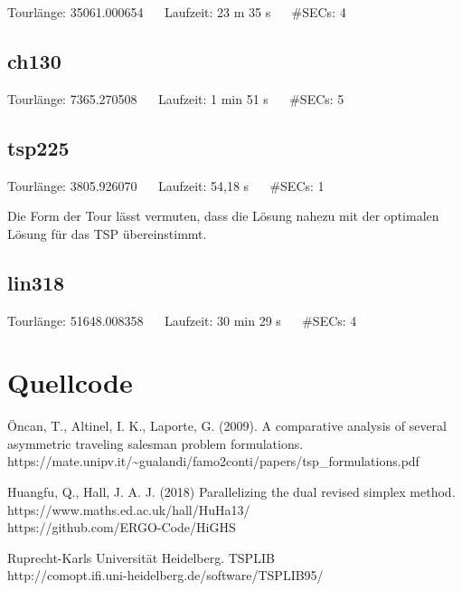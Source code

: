 \documentclass[a4paper, 10pt, ngerman]{article}
\begin{document}


\noindent Tourlänge: 35061.000654 $\quad$ Laufzeit: 23 m 35 s $\quad$ \#SECs: 4 

\subsection{ch130}



\noindent Tourlänge: 7365.270508 $\quad$ Laufzeit: 1 min 51 s $\quad$ \#SECs: 5

\subsection{tsp225}



\noindent Tourlänge: 3805.926070 $\quad$ Laufzeit: 54,18 s $\quad$ \#SECs: 1
\medskip

\noindent Die Form der Tour lässt vermuten, dass die Lösung nahezu mit der optimalen Lösung für das TSP übereinstimmt.

\subsection{lin318}



\noindent Tourlänge: 51648.008358 $\quad$ Laufzeit: 30 min 29 s $\quad$ \#SECs: 4

\section{Quellcode}

\begin{thebibliography}{1}
    Öncan, T., Altinel, I. K., Laporte, G. (2009).
    A comparative analysis of several asymmetric traveling salesman problem formulations. \\
    https://mate.unipv.it/\textasciitilde{}gualandi/famo2conti/papers/tsp\_formulations.pdf
    
    Huangfu, Q., Hall, J. A. J. (2018)
    Parallelizing the dual revised simplex method. \\
    https://www.maths.ed.ac.uk/hall/HuHa13/ \\
    https://github.com/ERGO-Code/HiGHS

    Ruprecht-Karls Universität Heidelberg. TSPLIB \\
    http://comopt.ifi.uni-heidelberg.de/software/TSPLIB95/ 
\end{thebibliography}
\end{document}
